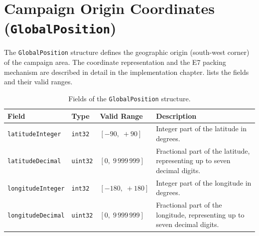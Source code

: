 \section{Campaign Origin Coordinates (\texttt{GlobalPosition})}\label{sec:appendix-a-origin-coordinated}

The \texttt{GlobalPosition} structure defines the geographic origin (south-west corner) of the campaign area.
The coordinate representation and the E7 packing mechanism are described in detail in the implementation chapter.  lists the fields and their valid ranges.

\begin{table}[H]
    \centering
    \caption{Fields of the \texttt{GlobalPosition} structure.}
    \label{tab:params-position}
    \small
    \begin{tabular}{p{3.8cm} l p{2.8cm} p{4.8cm}}
        \hline
        \textbf{Field} & \textbf{Type} & \textbf{Valid Range} & \textbf{Description} \\
        \hline
        \texttt{latitudeInteger}
        & \texttt{int32}
        & $[-90,\; +90]$
        & Integer part of the latitude in degrees. \\[6pt]

        \texttt{latitudeDecimal}
        & \texttt{uint32}
        & $[0,\; 9\,999\,999]$
        & Fractional part of the latitude, representing up to seven decimal digits. \\[6pt]

        \texttt{longitudeInteger}
        & \texttt{int32}
        & $[-180,\; +180]$
        & Integer part of the longitude in degrees. \\[6pt]

        \texttt{longitudeDecimal}
        & \texttt{uint32}
        & $[0,\; 9\,999\,999]$
        & Fractional part of the longitude, representing up to seven decimal digits. \\
        \hline
    \end{tabular}
\end{table}